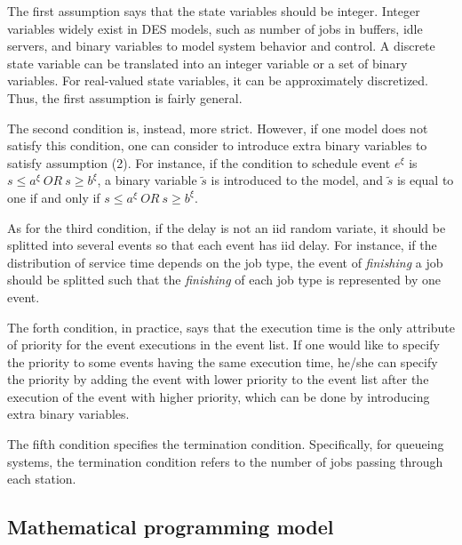\documentclass[]{interact}
\theoremstyle{plain}%
\theoremstyle{definition}
\theoremstyle{remark}
\begin{document}
The first assumption says that the state variables should be integer. Integer variables widely exist in DES models, such as number of jobs in buffers, idle servers, and binary variables to model system behavior and control. A discrete state variable can be translated into an integer variable or a set of binary variables. For real-valued state variables, it can be approximately discretized. Thus, the first assumption is fairly general.

The second condition is, instead, more strict. However, if one model does not satisfy this condition, one can consider to introduce extra binary variables to satisfy assumption (2). For instance, if the condition to schedule event $e^{\xi}$ is $s\le a^{\xi} \ OR\ s\ge b^{\xi}$, a binary variable $\tilde{s}$ is introduced to the model, and $\tilde{s}$ is equal to one if and only if 
$s\le a^{\xi} \ OR\ s\ge b^{\xi}$. 

 As for the third condition, if the delay is not an iid random variate, it should be splitted into several events so that each event has iid delay. For instance, if the distribution of service time depends on the job type, the event of \textit{finishing} a job should be splitted such that the \textit{finishing} of each job type is represented by one event. 
 
The forth condition, in practice, says that the execution time is the only attribute of priority for the event executions in the event list. If one would like to specify the priority to some events having the same execution time, he/she can specify the priority by adding the event with lower priority to the event list after the execution of the event with higher priority, which can be done by introducing extra binary variables.

The fifth condition specifies the termination condition. Specifically, for queueing systems, the termination condition refers to the number of jobs passing through each station. 


\subsection{Mathematical programming model}
\end{document}

